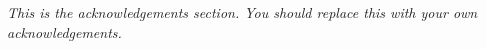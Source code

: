 \emph{This is the acknowledgements section. You should replace this with your
own acknowledgements.}